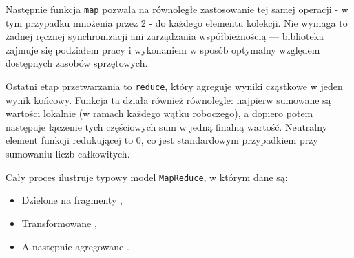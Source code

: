 Następnie funkcja \texttt{map} pozwala na równoległe zastosowanie tej samej operacji - w tym przypadku mnożenia przez 2 - do każdego elementu kolekcji. Nie wymaga to żadnej ręcznej synchronizacji ani zarządzania współbieżnością — biblioteka zajmuje się podziałem pracy i wykonaniem w sposób optymalny względem dostępnych zasobów sprzętowych.

Ostatni etap przetwarzania to \texttt{reduce}, który agreguje wyniki cząstkowe w jeden wynik końcowy. Funkcja ta działa również równolegle: najpierw sumowane są wartości lokalnie (w ramach każdego wątku roboczego), a dopiero potem następuje łączenie tych częściowych sum w jedną finalną wartość. Neutralny element funkcji redukującej to 0, co jest standardowym przypadkiem przy sumowaniu liczb całkowitych.

Cały proces ilustruje typowy model \texttt{MapReduce}, w którym dane są:
\begin{itemize}
\item Dzielone na fragmenty ,
\item Transformowane ,
\item A następnie agregowane .
\end{itemize}